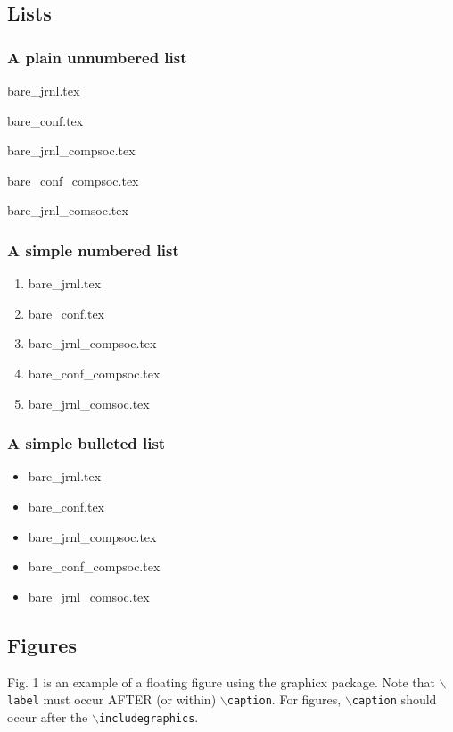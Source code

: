 \documentclass[lettersize,journal]{IEEEtran}
\begin{document}
\subsection{Lists}

\subsubsection*{\bf A plain  unnumbered list}
\begin{list}{}{}
\item{bare\_jrnl.tex}
\item{bare\_conf.tex}
\item{bare\_jrnl\_compsoc.tex}
\item{bare\_conf\_compsoc.tex}
\item{bare\_jrnl\_comsoc.tex}
\end{list}

\subsubsection*{\bf A simple numbered list}
\begin{enumerate}
\item{bare\_jrnl.tex}
\item{bare\_conf.tex}
\item{bare\_jrnl\_compsoc.tex}
\item{bare\_conf\_compsoc.tex}
\item{bare\_jrnl\_comsoc.tex}
\end{enumerate}

\subsubsection*{\bf A simple bulleted list}
\begin{itemize}
\item{bare\_jrnl.tex}
\item{bare\_conf.tex}
\item{bare\_jrnl\_compsoc.tex}
\item{bare\_conf\_compsoc.tex}
\item{bare\_jrnl\_comsoc.tex}
\end{itemize}





\subsection{Figures}
Fig. 1 is an example of a floating figure using the graphicx package.
 Note that $\backslash${\tt{label}} must occur AFTER (or within) $\backslash${\tt{caption}}.
 For figures, $\backslash${\tt{caption}} should occur after the $\backslash${\tt{includegraphics}}.
\end{document}
